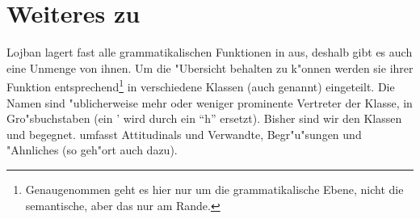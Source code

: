 \section{Weiteres zu }
Lojban lagert fast alle grammatikalischen Funktionen in  aus, deshalb gibt es auch eine Unmenge von ihnen. Um die "Ubersicht behalten zu k"onnen werden sie ihrer Funktion entsprechend\footnote{Genaugenommen geht es hier nur um die grammatikalische Ebene, nicht die semantische, aber das nur am Rande.}
in verschiedene Klassen (auch  genannt) eingeteilt. Die Namen sind "ublicherweise mehr oder weniger prominente Vertreter der Klasse, in Gro"sbuchstaben (ein ' wird durch ein ``h'' ersetzt).
Bisher sind wir den Klassen  und  begegnet.  umfasst Attitudinals und Verwandte,  Begr"u"sungen und "Ahnliches (so geh"ort  auch dazu).
